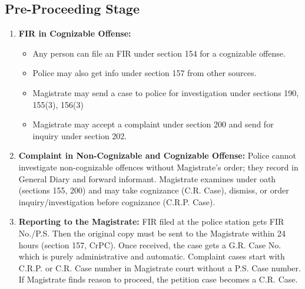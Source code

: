 \subsection{Pre-Proceeding Stage}
\begin{enumerate}[label=$({\roman*})$, itemsep=1em]
   \item \textbf{FIR in Cognizable Offense:}
   \begin{itemize}
      \item Any person can file an FIR under section 154 for a cognizable offense.
      \item Police may also get info under section 157 from other sources.\item Magistrate may send a case to police for investigation under sections 190, 155(3), 156(3)
      \item Magistrate may accept a complaint under section 200 and send for inquiry under section 202.
   \end{itemize}
      
   \item \textbf{Complaint in Non-Cognizable and Cognizable Offense:}
   Police cannot investigate non-cognizable offences without Magistrate's order; they record in General Diary and forward informant. Magistrate examines under oath (sections 155, 200) and may take cognizance (C.R. Case), dismiss, or order inquiry/investigation before cognizance (C.R.P. Case).

   \item \textbf{Reporting to the Magistrate:}
   FIR filed at the police station gets FIR No./P.S. Then the original copy must be sent to the Magistrate within 24 hours (section 157, CrPC). Once received, the case gets a G.R. Case No. which is purely administrative and automatic.
   Complaint cases start with C.R.P. or C.R. Case number in Magistrate court without a P.S. Case number. If Magistrate finds reason to proceed, the petition case becomes a C.R. Case.
   

\end{enumerate}
